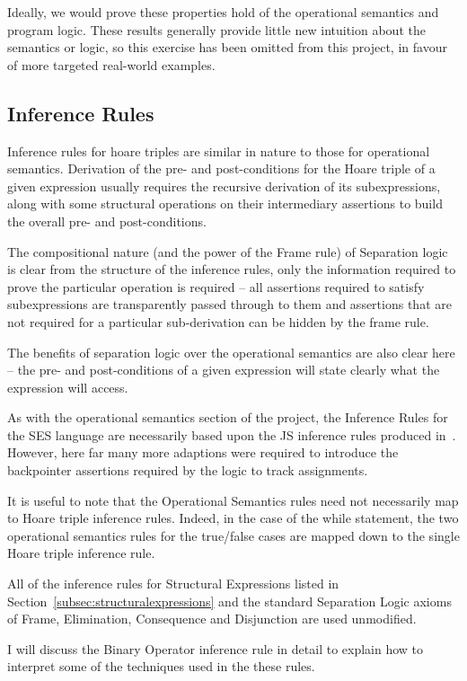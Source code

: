 \documentclass[a4paper,notitlepage]{report}
\begin{document}
Ideally, we would prove these properties hold of the operational semantics and
program logic. These results generally provide little new intuition about the
semantics or logic, so this exercise has been omitted from this project, in
favour of more targeted real-world examples.

\subsection{Inference Rules}
\label{sec:infrules}
Inference rules for hoare triples are similar in nature to those for operational
semantics. Derivation of the pre- and post-conditions for the Hoare triple of a
given expression usually requires the recursive derivation of its
subexpressions, along with some structural operations on their intermediary
assertions to build the overall pre- and post-conditions.

The compositional nature (and the power of the Frame rule) of Separation
logic is clear from the structure
of the inference rules, only the information required to prove the particular
operation is required -- all assertions required to satisfy subexpressions are
transparently passed through to them and assertions that are not required for a
particular sub-derivation can be hidden by the frame rule.

The benefits of separation logic over the operational semantics are also clear
here -- the pre- and post-conditions of a given expression will state clearly 
what the expression will access.

As with the operational semantics section of the project, the Inference Rules
for the SES language are necessarily based upon the JS inference rules produced
in~\cite{gms-popl}. However, here far many more adaptions were required to
introduce the backpointer assertions required by the logic to track assignments.

It is useful to note that the Operational Semantics rules need not necessarily
map to Hoare triple inference rules. Indeed, in the case of the while statement,
the two operational semantics rules for the true/false cases are mapped down to
the single Hoare triple inference rule.

All of the inference rules for Structural Expressions listed in
Section~\ref{subsec:structuralexpressions} and the standard Separation Logic
axioms of Frame, Elimination, Consequence and Disjunction are used unmodified.

I will discuss the Binary Operator inference rule in detail to explain how to
interpret some of the techniques used in the these rules.
\end{document}

